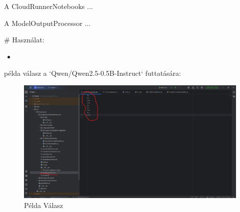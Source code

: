 \begin{Document}
                         A CloudRunnerNotebooks ...


                         A ModelOutputProcessor ...


                         # Használat:
                         \begin{itemize}
                             \item
                         \end{itemize}
                         példa válasz a `Qwen/Qwen2.5-0.5B-Instruct` futtatására:
                         \begin{figure}
                             \centering
                             \includegraphics[keepaspectratio]{pelda}
                             \caption{Példa Válasz}
                             \label{fig:PeldaValasz}
                         \end{figure}


\end{Document}